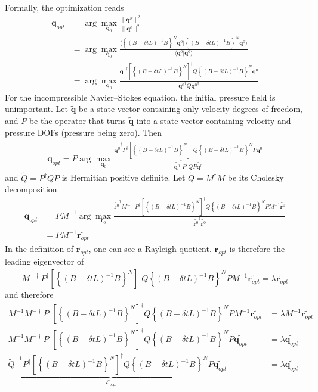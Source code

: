 \documentclass[12pts]{article}%
\def\v{\bm}
\def\wt{\widetilde}
\def\f{\frac}
\def\lb{\left[}
\def\rb{\right]}
\def\lcb{\left\{}
\def\rcb{\right\}}
\def\h{^\dagger}
\begin{document}
Formally, the optimization reads
\begin{align*}
  \v q_{opt} &= \arg \max_{\v q_0} \f{\|\v q^N\|^2}{\|\v q^0\|^2} \\
&= \arg \max_{\v q_0} \f{\langle \lcb (B - \delta t L)^{-1}B\rcb^N \v{q}^0  | \lcb (B - \delta t L)^{-1}B\rcb^N \v{q}^0 \rangle}{\langle \v q^0 | \v q^0\rangle} \\
&= \arg \max_{\v q_0} \f{{\v{q}^0}\h\lb\lcb (B - \delta t L)^{-1}B\rcb^N\rb\h  Q \lcb (B - \delta t L)^{-1}B\rcb^N \v{q}^0 }{{\v q^0}\h Q {\v q^0}\h}
\end{align*}
For the incompressible Navier--Stokes equation, the initial pressure
field is unimportant. Let $\wt{\v q}$ be a state vector containing
only velocity degrees of freedom, and $P$ be the operator that turns
$\wt{\v q}$ into a state vector containing velocity and pressure DOFs
(pressure being zero). Then
\begin{align*}
  \v q_{opt} = P\arg \max_{\v q_0} \f{\wt{\v{q}^0}\h P\h\lb\lcb (B - \delta t L)^{-1}B\rcb^N\rb\h  Q \lcb (B - \delta t L)^{-1}B\rcb^N P \wt{\v{q}^0} }{\wt{\v q^0}\h P\h Q P \wt{\v q^0}}
\end{align*}
and $\wt Q = P\h Q P$ is Hermitian positive definite. Let $\wt Q = M\h M$ be its Cholesky decomposition.
\begin{align*}
  \v q_{opt} &= PM^{-1} \arg \max_{\v r_0} \f{\wt{\v{r}^0}\h M^{-\dagger} P\h\lb\lcb (B - \delta t L)^{-1}B\rcb^N\rb\h  Q \lcb (B - \delta t L)^{-1}B\rcb^N P M^{-1}\wt{\v{r}^0} }{\wt{\v r^0}\h\wt{\v r^0}}\\
  & = PM^{-1} \wt{\v r_{opt}} 
\end{align*}
In the definition of $\wt{\v r_{opt}} $, one can see a Rayleigh
quotient. $\wt{\v r_{opt}}$ is therefore the leading eigenvector of
\begin{equation*}
M^{-\dagger} P\h\lb\lcb (B - \delta t L)^{-1}B\rcb^N\rb\h  Q \lcb (B - \delta t L)^{-1}B\rcb^N P M^{-1}\wt{\v{r}_{opt}} = \lambda\wt{\v{r}_{opt}} 
\end{equation*}
and therefore
\begin{align*}
 M^{-1} M^{-\dagger} P\h\lb\lcb (B - \delta t L)^{-1}B\rcb^N\rb\h  Q \lcb (B - \delta t L)^{-1}B\rcb^N P M^{-1}\wt{\v{r}_{opt}} &= \lambda M^{-1} \wt{\v{r}_{opt}} \\ 
 M^{-1} M^{-\dagger} P\h\lb\lcb (B - \delta t L)^{-1}B\rcb^N\rb\h  Q \lcb (B - \delta t L)^{-1}B\rcb^N P\wt{\v{q}_{opt}} &= \lambda \wt{\v{q}_{opt}} \\
 \underbrace{\wt{Q}^{-1} P\h\lb\lcb (B - \delta t L)^{-1}B\rcb^N\rb\h  Q \lcb (B - \delta t L)^{-1}B\rcb^N P}_{\mathcal L_{o.p.}}\wt{\v{q}_{opt}} &= \lambda \wt{\v{q}_{opt}}
\end{align*}
\end{document}
